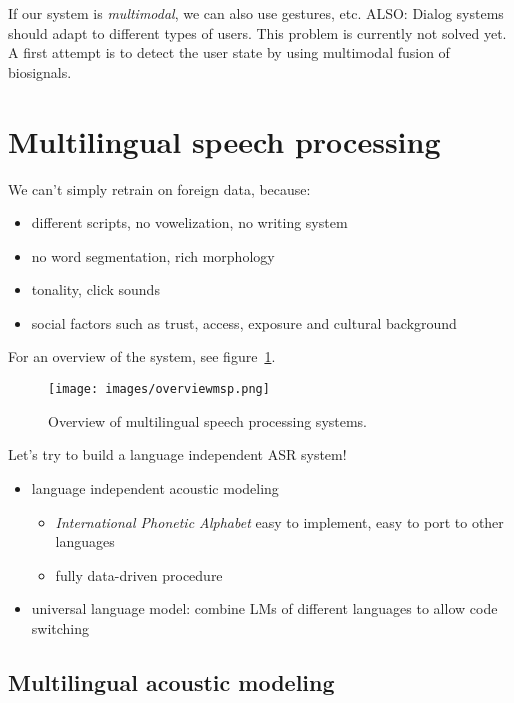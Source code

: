 \vspace{5pt}

If our system is \textit{multimodal}, we can also use gestures, etc. ALSO: Dialog systems should adapt to different types of users. This problem is currently not solved yet. A first attempt is to detect the user state by using multimodal fusion of biosignals. 

\newpage

\section{Multilingual speech processing}

We can't simply retrain on foreign data, because:
\begin{itemize}
    \item different scripts, no vowelization, no writing system
    \item no word segmentation, rich morphology
    \item tonality, click sounds
    \item social factors such as trust, access, exposure and cultural background
\end{itemize}
For an overview of the system, see figure~\ref{fig:overviewMSPS}.

\begin{figure}[htb]
\centering
\texttt{[image: images/overviewmsp.png]}
\caption{\label{fig:overviewMSPS} Overview of multilingual speech processing systems.}
\end{figure}

Let's try to build a language independent ASR system!
\begin{itemize}
    \item language independent acoustic modeling
        \begin{itemize}
            \item \textit{International Phonetic Alphabet} easy to implement, easy to port to other languages
            \item fully data-driven procedure
        \end{itemize}
    \item universal language model: combine LMs of different languages to allow code switching
\end{itemize}

\subsection{Multilingual acoustic modeling}

